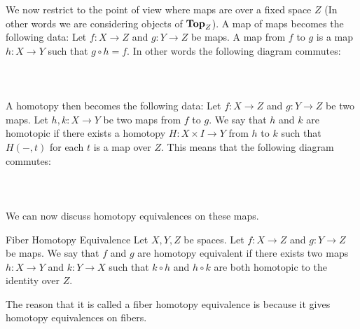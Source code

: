 \documentclass[a4paper]{article}
\begin{document}
We now restrict to the point of view where maps are over a fixed space $Z$ (In other words we are considering objects of $\bold{Top}_Z$). A map of maps becomes the following data: Let $f:X\to Z$ and $g:Y\to Z$ be maps. A map from $f$ to $g$ is a map $h:X\to Y$ such that $g\circ h=f$. In other words the following diagram commutes: \\~\\
\\~\\

A homotopy then becomes the following data: Let $f:X\to Z$ and $g:Y\to Z$ be two maps. Let $h,k:X\to Y$ be two maps from $f$ to $g$. We say that $h$ and $k$ are homotopic if there exists a homotopy $H:X\times I\to Y$ from $h$ to $k$ such that $H(-,t)$ for each $t$ is a map over $Z$. This means that the following diagram commutes: \\~\\
\\~\\

We can now discuss homotopy equivalences on these maps. 

\begin{defn}{Fiber Homotopy Equivalence}{} Let $X,Y,Z$ be spaces. Let $f:X\to Z$ and $g:Y\to Z$ be maps. We say that $f$ and $g$ are homotopy equivalent if there exists two maps $h:X\to Y$ and $k:Y\to X$ such that $k\circ h$ and $h\circ k$ are both homotopic to the identity over $Z$. 
\end{defn}

The reason that it is called a fiber homotopy equivalence is because it gives homotopy equivalences on fibers. 
\end{document}
